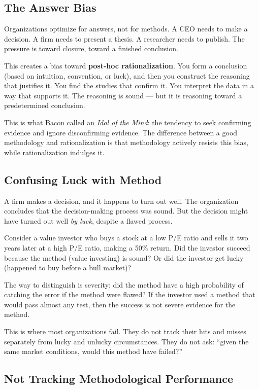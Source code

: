 \documentclass[11pt,letterpaper]{article}
\begin{document}
\subsection*{The Answer Bias}

Organizations optimize for answers, not for methods. A CEO needs to make a decision. A firm needs to present a thesis. A researcher needs to publish. The pressure is toward closure, toward a finished conclusion.

This creates a bias toward \textbf{post-hoc rationalization}. You form a conclusion (based on intuition, convention, or luck), and then you construct the reasoning that justifies it. You find the studies that confirm it. You interpret the data in a way that supports it. The reasoning is sound — but it is reasoning toward a predetermined conclusion.

This is what Bacon called an \textit{Idol of the Mind}: the tendency to seek confirming evidence and ignore disconfirming evidence. The difference between a good methodology and rationalization is that methodology actively resists this bias, while rationalization indulges it.

\subsection*{Confusing Luck with Method}

A firm makes a decision, and it happens to turn out well. The organization concludes that the decision-making process was sound. But the decision might have turned out well \emph{by luck}, despite a flawed process.

Consider a value investor who buys a stock at a low P/E ratio and sells it two years later at a high P/E ratio, making a 50\% return. Did the investor succeed because the method (value investing) is sound? Or did the investor get lucky (happened to buy before a bull market)?

The way to distinguish is severity: did the method have a high probability of catching the error if the method were flawed? If the investor used a method that would pass almost any test, then the success is not severe evidence for the method.

This is where most organizations fail. They do not track their hits and misses separately from lucky and unlucky circumstances. They do not ask: ``given the same market conditions, would this method have failed?''

\subsection*{Not Tracking Methodological Performance}
\end{document}
